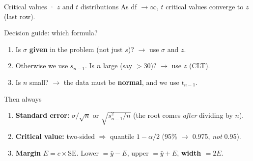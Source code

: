 \documentclass[
  11pt,
  ignorenonframetext,
  aspectratio=169,
]{beamer}
\providecommand{\tightlist}{%
  \setlength{\itemsep}{0pt}\setlength{\parskip}{0pt}}
\newcommand{\se}{\mathrm{SE}}
\begin{document}
\begin{frame}[shrink=5]{Critical values · \(z\) and \(t\) distributions}
\vspace{0.6em}
\centering\scriptsize As df \(\to\infty\), \(t\) critical values converge to \(z\) (last row).
\end{frame}


\begin{frame}{Decision guide: which formula?}
\protect{}\label{decision-guide-which-formula}
\begin{enumerate}
\tightlist
\item
  Is \(\sigma\) \textbf{given} in the problem (not just \(s\))? \(\to\)
  use \(\sigma\) and \(z\).
\item
  Otherwise we use \(s_{n-1}\). Is \(n\) large (say \(>30\))? \(\to\)
  use \(z\) (CLT).
\item
  Is \(n\) small? \(\to\) the data must be \textbf{normal}, and we use
  \(t_{n-1}\).
\end{enumerate}

\begin{block}{Then always}
\protect{}\label{then-always}
\begin{enumerate}
\tightlist
\item
  \textbf{Standard error:} \(\sigma/\sqrt n\) or \(\sqrt{s^2_{n-1}/n}\)
  (the root comes \emph{after} dividing by \(n\)).
\item
  \textbf{Critical value:} two-sided \(\Rightarrow\) quantile
  \(1-\alpha/2\) (95\% \(\to\) 0.975, \emph{not} 0.95).
\item
  \textbf{Margin} \(E=c\times\se\). Lower \(=\bar y-E\), upper
  \(=\bar y+E\), \textbf{width \(=2E\)}.
\end{enumerate}
\end{block}
\end{frame}
\end{document}

